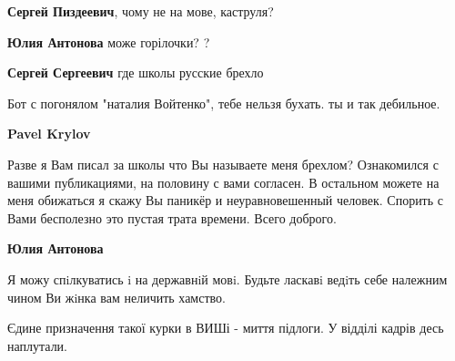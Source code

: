 \begin{itemize}
\begin{itemize}
 
\textbf{Сергей Пиздеевич}, чому не на мове, каструля?

 
\textbf{Юлия Антонова} може горілочки? ?

 
\textbf{Сергей Сергеевич} где школы русские брехло

 
Бот с погонялом "наталия Войтенко", тебе нельзя бухать. ты и так дебильное.

 
\textbf{Pavel Krylov} 

Разве я Вам писал за школы что Вы называете меня брехлом? Ознакомился с вашими
публикациями, на половину с вами согласен. В остальном можете на меня обижаться
я скажу Вы паникёр и неуравновешенный человек. Спорить с Вами бесполезно это
пустая трата времени. Всего доброго.

 
\textbf{Юлия Антонова} 

Я можу спiлкуватись i на державнiй мовi. Будьте ласкавi ведiть себе належним
чином Ви жiнка вам неличить хамство.


\end{itemize}

 
Єдине призначення такої курки в ВИШі - миття підлоги. У відділі кадрів десь наплутали.


\end{itemize}
